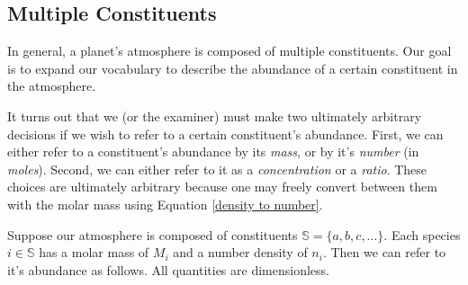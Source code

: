 \subsection{Multiple Constituents}\label{Multiple}

In general, a planet's atmosphere is composed of multiple constituents. Our goal is to expand our vocabulary to describe the abundance of a certain constituent in the atmosphere.

It turns out that we (or the examiner) must make two ultimately arbitrary decisions if we wish to refer to a certain constituent's abundance. First, we can either refer to a constituent's abundance by its \textit{mass}, or by it's \textit{number} (in \textit{moles}). Second, we can either refer to it as a \textit{concentration} or a \textit{ratio}. These choices are ultimately arbitrary because one may freely convert between them with the molar mass using Equation \ref{density to number}.

Suppose our atmosphere is composed of constituents  $\mathbb{S}=\{a,b,c,\ldots\}$. Each species $i\in\mathbb{S}$ has a molar mass of $M_i$ and a number density of $n_i$. Then we can refer to it's abundance as follows. All quantities are dimensionless.


